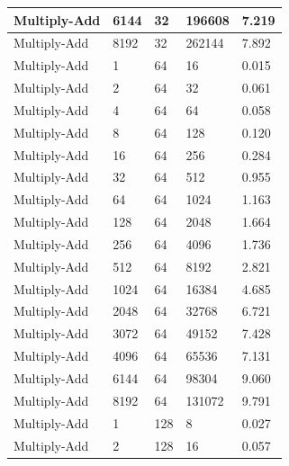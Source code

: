 \documentclass{article}
\begin{document}
\begin{longtable}{|l|l|l|l|l|}
Multiply-Add       & 6144 & 32          & 196608            & 7.219             \\ \hline
Multiply-Add       & 8192 & 32          & 262144            & 7.892             \\ \hline
Multiply-Add       & 1    & 64          & 16                & 0.015             \\ \hline
Multiply-Add       & 2    & 64          & 32                & 0.061             \\ \hline
Multiply-Add       & 4    & 64          & 64                & 0.058             \\ \hline
Multiply-Add       & 8    & 64          & 128               & 0.120             \\ \hline
Multiply-Add       & 16   & 64          & 256               & 0.284             \\ \hline
Multiply-Add       & 32   & 64          & 512               & 0.955             \\ \hline
Multiply-Add       & 64   & 64          & 1024              & 1.163             \\ \hline
Multiply-Add       & 128  & 64          & 2048              & 1.664             \\ \hline
Multiply-Add       & 256  & 64          & 4096              & 1.736             \\ \hline
Multiply-Add       & 512  & 64          & 8192              & 2.821             \\ \hline
Multiply-Add       & 1024 & 64          & 16384             & 4.685             \\ \hline
Multiply-Add       & 2048 & 64          & 32768             & 6.721             \\ \hline
Multiply-Add       & 3072 & 64          & 49152             & 7.428             \\ \hline
Multiply-Add       & 4096 & 64          & 65536             & 7.131             \\ \hline
Multiply-Add       & 6144 & 64          & 98304             & 9.060             \\ \hline
Multiply-Add       & 8192 & 64          & 131072            & 9.791             \\ \hline
Multiply-Add       & 1    & 128         & 8                 & 0.027             \\ \hline
Multiply-Add       & 2    & 128         & 16                & 0.057             \\ \hline

\end{longtable}
\end{document}
